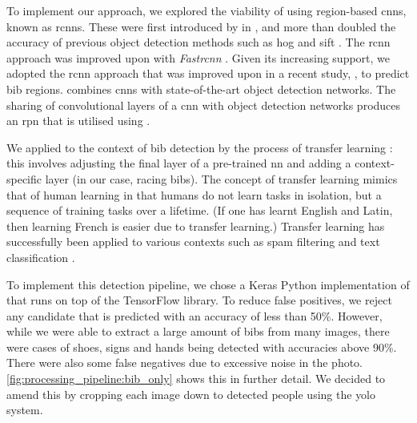 To implement our approach, we explored the viability of using region-based \glspl{cnn}, known as \glspl{rcnn}. These were first introduced by \citet{Girshick:2014jx} in \citeyear{Girshick:2014jx}, and more than doubled the accuracy of previous object detection methods such as \gls{hog} \citep{Dalal:2005jq} and \gls{sift} \citep{Lowe:2004kp}. The \gls{rcnn} approach was improved upon with \textit{Fast\gls{rcnn}} \citep{Girshick:2015vr}. Given its increasing support, we adopted the \gls{rcnn} approach that was improved upon in a  recent \citeyear{Ren:2017ug} study, \textit{\frcnn{}} \citep{Ren:2017ug}, to predict bib regions. \frcnn{} combines \glspl{cnn} with state-of-the-art object detection networks. The sharing of convolutional layers of a \gls{cnn} with object detection networks produces an \gls{rpn} that is utilised using \frcnn{}.

We applied \frcnn{} to the context of bib detection by the process of transfer learning \cite{Caruana:1997wk,Thrun:1996wh,Baxter:1997wr}: this involves adjusting the final layer of a pre-trained \gls{nn} and adding a context-specific layer (in our case, racing bibs). The concept of transfer learning mimics that of human learning in that humans do not learn tasks in isolation, but a sequence of training tasks over a lifetime. (If one has learnt English and Latin, then learning French is easier due to transfer learning.) Transfer learning has successfully been applied to various contexts such as spam filtering \citep{Bickel:2006ul} and text classification \citep{Raina:2006tv, Do:2005uz}.

To implement this detection pipeline, we chose a Keras \citep{chollet2015keras} Python implementation of \frcnn{} that runs on top of the TensorFlow \citep{tensorflow2015-whitepaper} library. To reduce false positives, we reject any candidate that is predicted with an accuracy of less than 50\%. However, while we were able to extract a large amount of bibs from many images, there were cases of shoes, signs and hands being detected with accuracies above 90\%. There were also some false negatives due to excessive noise in the photo. \cref{fig:processing_pipeline:bib_only} shows this in further detail. We decided to amend this by cropping each image down to detected people using the \gls{yolo} system.

